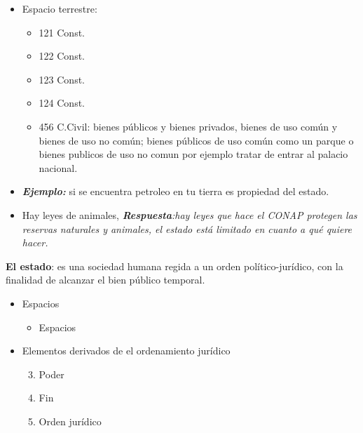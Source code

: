 \begin{itemize}
\begin{enumerate}
        \begin{itemize}
            \item Espacio terrestre:
            \begin{itemize}
                \item 121 Const.
                \item 122 Const.
                \item 123 Const.
                \item 124 Const.
                \item 456 C.Civil: bienes públicos y bienes privados, bienes de uso común y bienes de uso no común; bienes públicos de uso común como un parque o bienes publicos de uso no comun por ejemplo tratar de entrar al palacio nacional.
            \end{itemize}
            \item \textbf{\emph{Ejemplo:}} si se encuentra petroleo en tu tierra es propiedad del estado.
            \item Hay leyes de animales, \emph{\textbf{Respuesta}:hay leyes que hace el CONAP protegen las reservas naturales y animales, el estado está limitado en cuanto a qué quiere hacer.}
        \end{itemize}
    \end{enumerate} 
    
\end{itemize}


\textbf{El estado}: es una sociedad humana regida a un orden político-jurídico, con la finalidad de alcanzar el bien público temporal.


\begin{itemize}
    \item Espacios
    \begin{itemize}
        \item Espacios
    \end{itemize}

    \item Elementos derivados de el ordenamiento jurídico
    
    
    \begin{enumerate}\setcounter{enumi}{2}
        \item Poder
        \item Fin
        \item Orden jurídico
    \end{enumerate}


\end{itemize}
